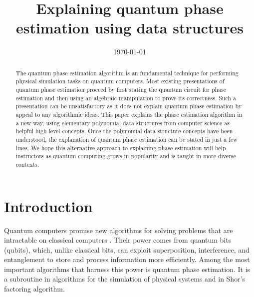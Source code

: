 \documentclass[prb,preprint]{revtex4}
\begin{document}
	

\title{Explaining quantum phase estimation using data structures}
\date{\today}
\begin{abstract}
	The quantum phase estimation algorithm is an fundamental technique for performing physical simulation tasks on quantum computers. 
	Most existing presentations of quantum phase estimation proceed by first stating the quantum circuit for phase estimation and then using an algebraic manipulation to prove its correctness. Such a presentation can be unsatisfactory as it does not explain quantum phase estimation by appeal to any algorithmic ideas.
	This paper explains the phase estimation algorithm in a new way, using elementary polynomial data structures from computer science as helpful high-level concepts. 
	Once the polynomial data structure concepts have been understood, the explanation of quantum phase estimation can be stated in just a few lines.
	We hope this alternative approach to explaining phase estimation will help instructors as quantum computing grows in popularity and is taught in more diverse contexts.
\end{abstract}
\maketitle




\section{Introduction}


	
Quantum computers promise new algorithms for solving problems that are intractable on classical computers \cite{nielsen2010quantum}. Their power comes from quantum bits (qubits), which, unlike classical bits, can exploit superposition, interference, and entanglement to store and process information more efficiently. Among the most important algorithms that harness this power is quantum phase estimation\cite{kitaev1995quantum}. It is a subroutine in algorithms for the simulation of physical systems\cite{abrams1999quantum} and in Shor’s factoring algorithm\cite{shor1994algorithms}.
\end{document}
